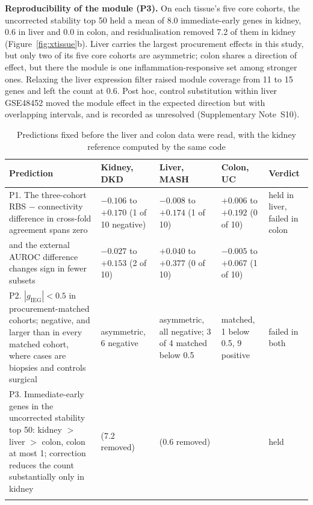 \documentclass[unnumsec,webpdf,contemporary,large,numbered]{oup-authoring-template}
\begin{document}
\textbf{Reproducibility of the module (P3).} On each tissue's five core cohorts, the uncorrected
stability top 50 held a mean of 8.0 immediate-early genes in kidney, 0.6 in liver and 0.0 in colon,
and residualisation removed 7.2 of them in kidney (Figure~\ref{fig:xtissue}b). Liver carries the
largest procurement effects in this study, but only two of its five core cohorts are asymmetric;
colon shares a direction of effect, but there the module is one inflammation-responsive set among
stronger ones. Relaxing the liver expression filter raised module coverage from 11 to 15 genes and
left the count at 0.6. Post hoc, control substitution within liver GSE48452 moved the module effect
in the expected direction but with overlapping intervals, and is recorded as unresolved
(Supplementary Note~S10).

\begin{table}[!t]
\caption{Predictions fixed before the liver and colon data were read, with the kidney reference computed by the same code}\label{tab:xtissue}
\tabcolsep=0pt
\begin{tabular*}{\textwidth}{@{\extracolsep\fill}>{\raggedright\arraybackslash}p{58mm}>{\raggedright\arraybackslash}p{29mm}>{\raggedright\arraybackslash}p{29mm}>{\raggedright\arraybackslash}p{29mm}>{\raggedright\arraybackslash}p{25mm}@{\extracolsep\fill}}
\toprule
Prediction & Kidney, DKD & Liver, MASH & Colon, UC & Verdict \\
\midrule
P1. The three-cohort RBS $-$ connectivity difference in cross-fold agreement spans zero & $-0.106$ to $+0.170$ (1 of 10 negative) & $-0.008$ to $+0.174$ (1 of 10) & $+0.006$ to $+0.192$ (0 of 10) & held in liver, failed in colon \\
\quad and the external AUROC difference changes sign in fewer subsets & $-0.027$ to $+0.153$ (2 of 10) & $+0.040$ to $+0.377$ (0 of 10) & $-0.005$ to $+0.067$ (1 of 10) & \\
P2. $|g_{\text{IEG}}| < 0.5$ in procurement-matched cohorts; negative, and larger than in every matched cohort, where cases are biopsies and controls surgical & 7 asymmetric, 6 negative & 3 asymmetric, all negative; 3 of 4 matched below 0.5 & 10 matched, 1 below 0.5, 9 positive & failed in both \\
P3. Immediate-early genes in the uncorrected stability top 50: kidney $>$ liver $>$ colon, colon at most 1; correction reduces the count substantially only in kidney & 8.0 (7.2 removed) & 0.6 (0.6 removed) & 0.0 & held \\
\botrule
\end{tabular*}

\end{table}
\end{document}
